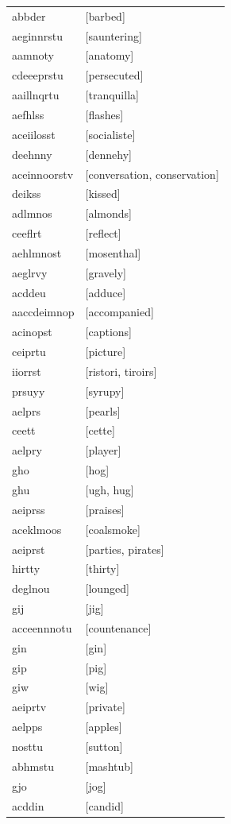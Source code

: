 \documentclass{article}
\begin{document}
\begin{tabular}{ll}
abbder & [barbed] \\
aeginnrstu & [sauntering] \\
aamnoty & [anatomy] \\
cdeeeprstu & [persecuted] \\
aaillnqrtu & [tranquilla] \\
aefhlss & [flashes] \\
aceiilosst & [socialiste] \\
deehnny & [dennehy] \\
aceinnoorstv & [conversation, conservation] \\
deikss & [kissed] \\
adlmnos & [almonds] \\
ceeflrt & [reflect] \\
aehlmnost & [mosenthal] \\
aeglrvy & [gravely] \\
acddeu & [adduce] \\
aaccdeimnop & [accompanied] \\
acinopst & [captions] \\
ceiprtu & [picture] \\
iiorrst & [ristori, tiroirs] \\
prsuyy & [syrupy] \\
aelprs & [pearls] \\
ceett & [cette] \\
aelpry & [player] \\
gho & [hog] \\
ghu & [ugh, hug] \\
aeiprss & [praises] \\
aceklmoos & [coalsmoke] \\
aeiprst & [parties, pirates] \\
hirtty & [thirty] \\
deglnou & [lounged] \\
gij & [jig] \\
acceennnotu & [countenance] \\
gin & [gin] \\
gip & [pig] \\
giw & [wig] \\
aeiprtv & [private] \\
aelpps & [apples] \\
nosttu & [sutton] \\
abhmstu & [mashtub] \\
gjo & [jog] \\
acddin & [candid] \\

\end{tabular}
\end{document}
